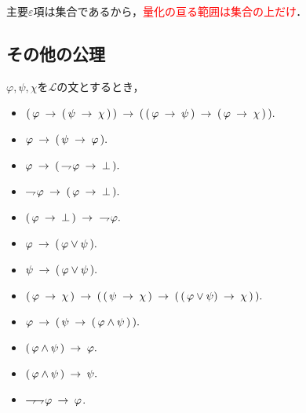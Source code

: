 	主要$\varepsilon$項は集合であるから，\textcolor{red}{量化の亘る範囲は集合の上だけ}．
	
	\begin{comment}
	\begin{screen}
		\begin{thm}
			甲種式$\varphi(x)$に対して
			\begin{align}
				\forall x \varphi(x) \Longleftrightarrow
				\varphi\left(\varepsilon x \rightharpoondown \hat{\varphi}(x)\right).
			\end{align}
		\end{thm}
	\end{screen}
	\end{comment}

\newpage
\subsection{その他の公理}
	\begin{screen}
		\begin{logicalaxm}
			$\varphi,\psi,\chi$を$\mathcal{L}$の文とするとき，
			\begin{itemize}
				\item $(\, \varphi \rarrow (\, \psi \rarrow \chi\, )\, ) 
					\rarrow (\, (\, \varphi \rarrow \psi\, )
					\rarrow (\, \varphi \rarrow \chi\, )\, ).$
				\item $\varphi \rarrow (\, \psi \rarrow \varphi\, ).$
				\item $\varphi \rarrow (\, \negation \varphi \rarrow \bot\, ).$
				\item $\negation \varphi \rarrow (\, \varphi \rarrow \bot\, ).$
				\item $(\, \varphi \rarrow \bot\, ) \rarrow\ \negation \varphi.$
				\item $\varphi \rarrow (\, \varphi \vee \psi\, ).$
				\item $\psi \rarrow (\, \varphi \vee \psi\, ).$
				\item $(\, \varphi \rarrow \chi\, ) \rarrow 
					(\, (\, \psi \rarrow \chi\, ) 
					\rarrow (\, (\, \varphi \vee \psi) \rarrow \chi\, )\, ).$
				\item $\varphi \rarrow (\, \psi \rarrow (\, \varphi \wedge \psi\, )\, ).$
				\item $(\, \varphi \wedge \psi\, ) \rarrow \varphi.$
				\item $(\, \varphi \wedge \psi\, ) \rarrow \psi.$
				\item $\negation \negation \varphi \rarrow \varphi$.
			\end{itemize}
		\end{logicalaxm}
	\end{screen}